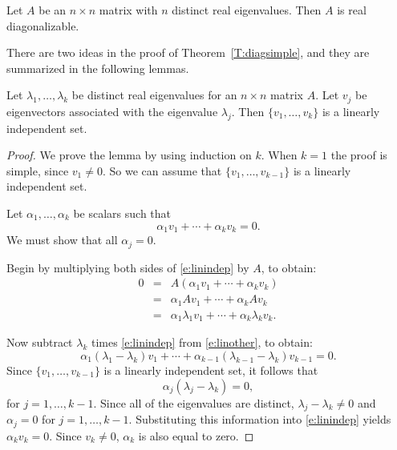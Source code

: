 \documentclass{ximera}
\begin{document}
\begin{theorem}  \label{T:diagsimple}
Let $A$ be an $n\times n$ matrix with $n$ distinct real
eigenvalues.  
Then $A$ is real diagonalizable.
\end{theorem}  

There are two ideas in the proof of Theorem~\ref{T:diagsimple}, and 
they are summarized in the following lemmas.

\begin{lemma} \label{L:simpleeigen}
Let $\lambda_1,\ldots,\lambda_k$ be distinct real eigenvalues
for an $n\times n$ matrix $A$.  Let $v_j$ be eigenvectors
associated with the eigenvalue $\lambda_j$.  Then
$\{v_1,\ldots,v_k\}$ is a linearly independent set.
\end {lemma} 

\begin{proof} We prove the lemma by using induction on $k$.  When $k=1$
the proof is simple, since $v_1\neq 0$.  So we can assume that
$\{v_1,\ldots,v_{k-1}\}$ is a linearly independent set. 

Let $\alpha_1,\ldots,\alpha_k$ be scalars such that
\begin{equation}  \label{e:linindep}
\alpha_1 v_1 + \cdots + \alpha_k v_k = 0.
\end{equation}
We must show that all $\alpha_j=0$.

Begin by multiplying both sides of \eqref{e:linindep} by $A$, to
obtain: 
\begin{eqnarray}
0 & = & A(\alpha_1 v_1 + \cdots + \alpha_k v_k) \nonumber \\
& = & \alpha_1 Av_1 + \cdots + \alpha_k Av_k \label{e:linother}\\
& = & \alpha_1 \lambda_1 v_1 + \cdots + \alpha_k \lambda_k v_k.\nonumber
\end{eqnarray}

Now subtract $\lambda_k$ times \eqref{e:linindep} from \eqref{e:linother},
to obtain:
\[
\alpha_1(\lambda_1-\lambda_k)v_1 + \cdots +
\alpha_{k-1}(\lambda_{k-1}-\lambda_k)v_{k-1} = 0.
\]
Since $\{v_1,\ldots,v_{k-1}\}$ is a linearly independent set, it
follows that 
\[
\alpha_j(\lambda_j-\lambda_k)=0,
\]
for $j=1,\ldots,k-1$.  Since all of the eigenvalues are
distinct, $\lambda_j-\lambda_k\neq 0$ and $\alpha_j=0$ for
$j=1,\ldots,k-1$. Substituting this information into
\eqref{e:linindep} yields $\alpha_k v_k=0$.  Since $v_k\neq 0$, 
$\alpha_k$ is also equal to zero.  \end{proof}
\end{document}
